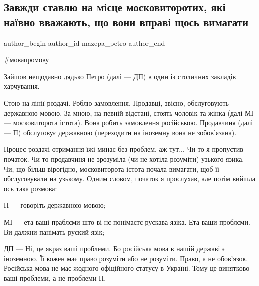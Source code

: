  
 
 
 
 
 
\subsection{Завжди ставлю на місце московиторотих, які наївно вважають, що вони вправі щось вимагати}
\label{sec:12_12_2021.fb.mazepa_petro.1.moskvoroti}
 
\ifcmt
 author_begin
   author_id mazepa_petro
 author_end
\fi

\#мовапромову 

Зайшов нещодавно дядько Петро (далі — ДП) в один із столичних закладів
харчування.


Стою на лінії роздачі. Роблю замовлення. Продавці, звісно, обслуговують
державною мовою. За мною, на певній відстані, стоять чоловік та жінка (далі МІ
— московиторота істота). Вона робить замовлення російською. Продавчиня (далі —
П) обслуговує державною (переходити на іноземну вона не зобов'язана). 

Процес роздачі-отримання їжі минає без проблем, аж тут... Чи то я пропустив
початок. Чи то продавчиня не зрозуміла (чи не хотіла розуміти) узького язика.
Чи, що більш вірогідно, московиторота істота почала вимагати, щоб її
обслуговували на узькому. Одним словом, початок я прослухав, але потім вийшла
ось така розмова:

П — говоріть державною мовою;

МІ — ета ваші праблєми што ві нє понімаєтє рускава язіка. Ета ваши проблєми. Ви
далжни панімать руский язік;

ДП — Ні, це якраз ваші проблеми. Бо російська мова в нашій державі є іноземною.
Її кожен має право розуміти або не розуміти. Право, а не обов'язок. Російська
мова не має жодного офіційного статусу в Україні. Тому це винятково ваші
проблеми, а не проблеми П.

